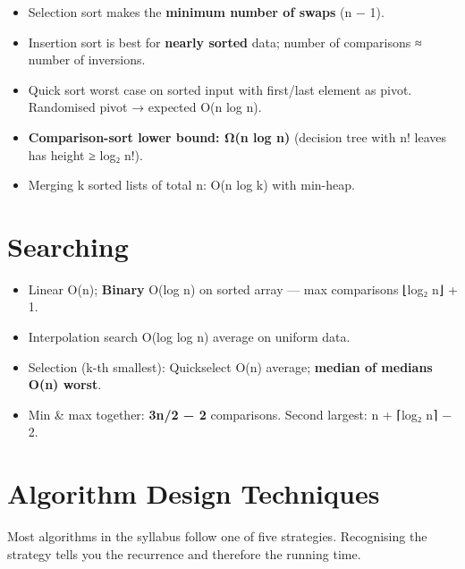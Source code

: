 \endgroup

\begin{itemize}
\tightlist
\item
  Selection sort makes the \textbf{minimum number of swaps} (n − 1).
\item
  Insertion sort is best for \textbf{nearly sorted} data; number of comparisons ≈ number of inversions.
\item
  Quick sort worst case on sorted input with first/last element as pivot. Randomised pivot → expected O(n log n).
\item
  \textbf{Comparison-sort lower bound: Ω(n log n)} (decision tree with n! leaves has height ≥ log₂ n!).
\item
  Merging k sorted lists of total n: O(n log k) with min-heap.
\end{itemize}



\needspace{95pt}

\hypertarget{p2-07--6-searching}{%
\section{Searching}\label{p2-07--6-searching}}

\begin{itemize}
\tightlist
\item
  Linear O(n); \textbf{Binary} O(log n) on sorted array --- max comparisons ⌊log₂ n⌋ + 1.
\item
  Interpolation search O(log log n) average on uniform data.
\item
  Selection (k-th smallest): Quickselect O(n) average; \textbf{median of medians O(n) worst}.
\item
  Min \& max together: \textbf{3n/2 − 2} comparisons. Second largest: n + ⌈log₂ n⌉ − 2.
\end{itemize}

\needspace{125pt}

\hypertarget{p2-07--7-algorithm-design-techniques}{%
\section{Algorithm Design Techniques}\label{p2-07--7-algorithm-design-techniques}}

Most algorithms in the syllabus follow one of five strategies. Recognising the strategy tells you the recurrence
and therefore the running time.



